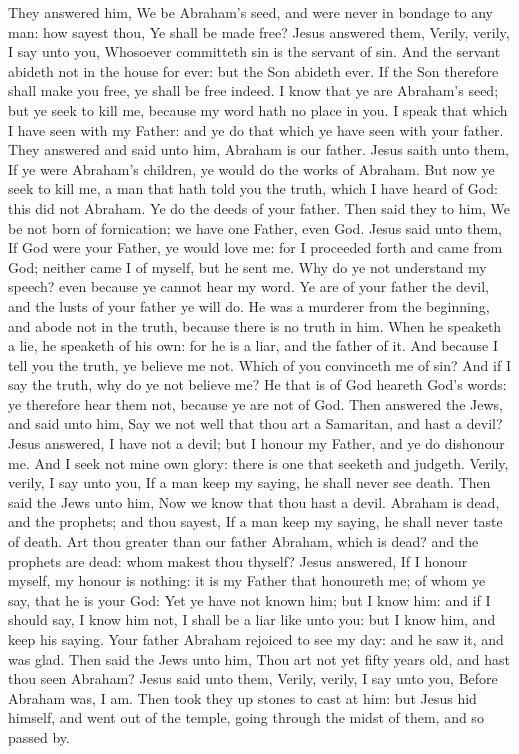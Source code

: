  They answered him, We be Abraham's seed, and were never in
bondage to any man: how sayest thou, Ye shall be made free?
 Jesus answered them, Verily, verily, I say unto you,
Whosoever committeth sin is the servant of sin.  And the
servant abideth not in the house for ever: but the Son abideth ever.
 If the Son therefore shall make you free, ye shall be free
indeed.  I know that ye are Abraham's seed; but ye seek to
kill me, because my word hath no place in you.  I speak
that which I have seen with my Father: and ye do that which ye have seen
with your father.  They answered and said unto him, Abraham
is our father. Jesus saith unto them, If ye were Abraham's children, ye
would do the works of Abraham.  But now ye seek to kill me,
a man that hath told you the truth, which I have heard of God: this did
not Abraham.  Ye do the deeds of your father. Then said
they to him, We be not born of fornication; we have one Father, even
God.  Jesus said unto them, If God were your Father, ye
would love me: for I proceeded forth and came from God; neither came I
of myself, but he sent me.  Why do ye not understand my
speech? even because ye cannot hear my word.  Ye are of
your father the devil, and the lusts of your father ye will do. He was a
murderer from the beginning, and abode not in the truth, because there
is no truth in him. When he speaketh a lie, he speaketh of his own: for
he is a liar, and the father of it.  And because I tell you
the truth, ye believe me not.  Which of you convinceth me
of sin? And if I say the truth, why do ye not believe me? 
He that is of God heareth God's words: ye therefore hear them not,
because ye are not of God.  Then answered the Jews, and
said unto him, Say we not well that thou art a Samaritan, and hast a
devil?  Jesus answered, I have not a devil; but I honour my
Father, and ye do dishonour me.  And I seek not mine own
glory: there is one that seeketh and judgeth.  Verily,
verily, I say unto you, If a man keep my saying, he shall never see
death.  Then said the Jews unto him, Now we know that thou
hast a devil. Abraham is dead, and the prophets; and thou sayest, If a
man keep my saying, he shall never taste of death.  Art
thou greater than our father Abraham, which is dead? and the prophets
are dead: whom makest thou thyself?  Jesus answered, If I
honour myself, my honour is nothing: it is my Father that honoureth me;
of whom ye say, that he is your God:  Yet ye have not known
him; but I know him: and if I should say, I know him not, I shall be a
liar like unto you: but I know him, and keep his saying. 
Your father Abraham rejoiced to see my day: and he saw it, and was glad.
 Then said the Jews unto him, Thou art not yet fifty years
old, and hast thou seen Abraham?  Jesus said unto them,
Verily, verily, I say unto you, Before Abraham was, I am. 
Then took they up stones to cast at him: but Jesus hid himself, and went
out of the temple, going through the midst of them, and so passed by.

